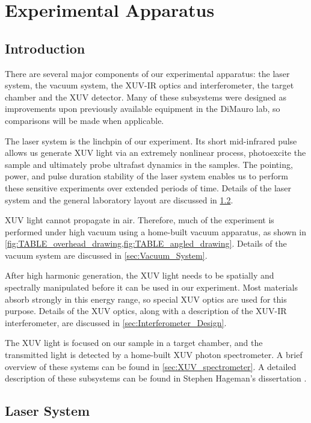 \chapter{Experimental Apparatus}

\section{Introduction}

There are several major components of our experimental apparatus: the laser system, the vacuum system, the XUV-IR optics and interferometer, the target chamber and the XUV detector. Many of these subsystems were designed as improvements upon previously available equipment in the DiMauro lab, so comparisons will be made when applicable.

The laser system is the linchpin of our experiment. Its short mid-infrared pulse allows us generate XUV light via an extremely nonlinear process, photoexcite the sample and ultimately probe ultrafast dynamics in the samples. The pointing, power, and pulse duration stability of the laser system enables us to perform these sensitive experiments over extended periods of time. Details of the laser system and the general laboratory layout are discussed in \cref{sec:Laser_System}.

XUV light cannot propagate in air. Therefore, much of the experiment is performed under high vacuum using a home-built vacuum apparatus, as shown in \cref{fig:TABLE_overhead_drawing,fig:TABLE_angled_drawing}. Details of the vacuum system are discussed in \cref{sec:Vacuum_System}.

After high harmonic generation, the XUV light needs to be spatially and spectrally manipulated before it can be used in our experiment. Most materials absorb strongly in this energy range, so special XUV optics are used for this purpose. Details of the XUV optics, along with a description of the XUV-IR interferometer, are discussed in \cref{sec:Interferometer_Design}. 

The XUV light is focused on our sample in a target chamber, and the transmitted light is detected by a home-built XUV photon spectrometer. A brief overview of these systems can be found in \cref{sec:XUV_spectrometer}. A detailed description of these subsystems can be found in Stephen Hageman's dissertation \cite{hagemanComplexAttosecondTransientAbsorption2020}.


\section{Laser System}
\label{sec:Laser_System}

